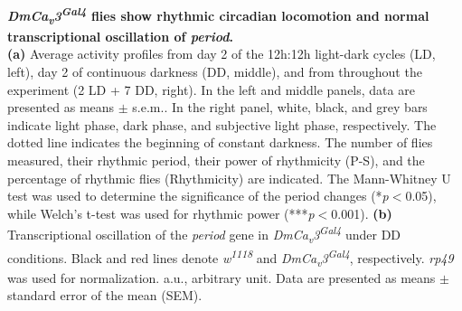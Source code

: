 \label{fig:4}
\textbf{ \emph{DmCa\textsubscript{v}3\textsuperscript{Gal4}} flies show rhythmic circadian locomotion and normal transcriptional oscillation of \emph{period}.}
\\
\textbf{(a)} Average activity profiles from day 2 of the 12h:12h light-dark cycles (LD, left), day 2 of continuous darkness (DD, middle), and from throughout the experiment (2 LD + 7 DD, right).
In the left and middle panels, data are presented as means $\pm$ s.e.m..
In the right panel, white, black, and grey bars indicate light phase, dark phase, and subjective light phase, respectively.
The dotted line indicates the beginning of constant darkness. 
The number of flies measured, their rhythmic period, their power of rhythmicity (P-S), and the percentage of rhythmic flies (Rhythmicity) are indicated.
The Mann-Whitney U test was used to determine the significance of the period changes (*\emph{p}$<$0.05), while Welch's t-test was used for rhythmic power (***\emph{p}$<$0.001). 
\textbf{(b)} Transcriptional oscillation of the \emph{period} gene in \emph{DmCa\textsubscript{v}3\textsuperscript{Gal4}} under DD conditions. Black and red lines denote \emph{w\textsuperscript{1118}} and \emph{DmCa\textsubscript{v}3\textsuperscript{Gal4}}, respectively.
\emph{rp49} was used for normalization.
a.u., arbitrary unit.
Data are presented as means $\pm$ standard error of the mean (SEM).